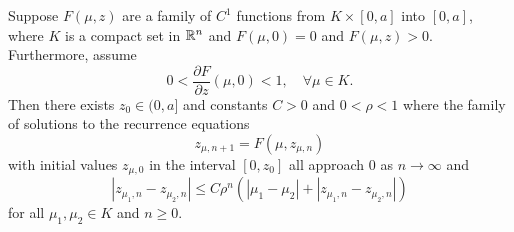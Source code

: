 \begin{lem}\label{discrete-gronwall-estimate}
	Suppose \(F(\mu, z)\) are a family of \(C^1\) functions from \(K \times [0,a]\) into \([0,a]\), where \(K\) is a compact set in \(\mathbb{R}^n\) and \(F(\mu, 0) = 0\) and \(F(\mu, z) > 0\). Furthermore, assume
	\begin{equation}
		0< \frac{\partial F}{\partial z} (\mu , 0) < 1, \quad \forall \mu \in K.
	\end{equation}
	Then there exists \(z_0 \in (0,a]\) and constants \(C> 0\) and \(0<\rho< 1\) where the family of solutions to the recurrence equations
	\begin{equation}
		z_{\mu, n+1} = F(\mu, z_{\mu, n})
	\end{equation}
	with initial values \(z_{\mu, 0}\) in the interval \([0,z_0]\) all approach \(0\) as \(n\to \infty\) and
	\begin{equation}
		|z_{\mu_1,n} - z_{\mu_2,n} | \leq C \rho^n( |\mu_1- \mu_2| + |z_{\mu_1,n} - z_{\mu_2,n}|)
	\end{equation}
	for all \(\mu_1,\mu_2 \in K\) and \(n\geq 0\).
\end{lem}

